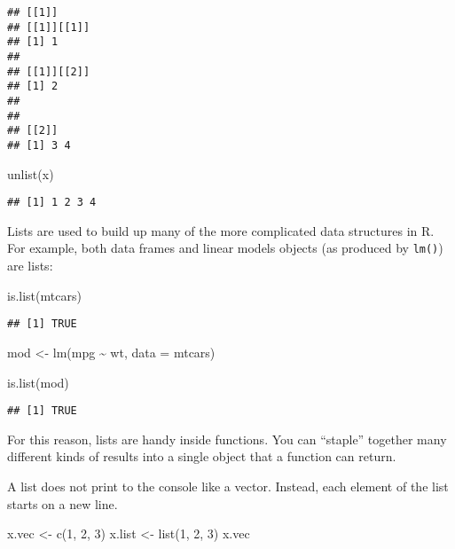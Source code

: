 \documentclass[
]{book}
\newenvironment{Shaded}{\begin{snugshade}}{\end{snugshade}}
\newcommand{\AttributeTok}[1]{\textcolor[rgb]{0.77,0.63,0.00}{#1}}
\newcommand{\DecValTok}[1]{\textcolor[rgb]{0.00,0.00,0.81}{#1}}
\newcommand{\FunctionTok}[1]{\textcolor[rgb]{0.00,0.00,0.00}{#1}}
\newcommand{\NormalTok}[1]{#1}
\newcommand{\OtherTok}[1]{\textcolor[rgb]{0.56,0.35,0.01}{#1}}
\newcommand{\SpecialCharTok}[1]{\textcolor[rgb]{0.00,0.00,0.00}{#1}}
\begin{document}
\begin{verbatim}
## [[1]]
## [[1]][[1]]
## [1] 1
## 
## [[1]][[2]]
## [1] 2
## 
## 
## [[2]]
## [1] 3 4
\end{verbatim}

\begin{Shaded}
\begin{Highlighting}[]
\FunctionTok{unlist}\NormalTok{(x)}
\end{Highlighting}
\end{Shaded}

\begin{verbatim}
## [1] 1 2 3 4
\end{verbatim}

Lists are used to build up many of the more complicated data structures in R. For example, both data frames and linear models objects (as produced by \texttt{lm()}) are lists:

\begin{Shaded}
\begin{Highlighting}[]
\FunctionTok{is.list}\NormalTok{(mtcars)}
\end{Highlighting}
\end{Shaded}

\begin{verbatim}
## [1] TRUE
\end{verbatim}

\begin{Shaded}
\begin{Highlighting}[]
\NormalTok{mod }\OtherTok{\textless{}{-}} \FunctionTok{lm}\NormalTok{(mpg }\SpecialCharTok{\textasciitilde{}}\NormalTok{ wt, }\AttributeTok{data =}\NormalTok{ mtcars)}

\FunctionTok{is.list}\NormalTok{(mod)}
\end{Highlighting}
\end{Shaded}

\begin{verbatim}
## [1] TRUE
\end{verbatim}

For this reason, lists are handy inside functions. You can ``staple'' together many different kinds of results into a single object that a function can return.

A list does not print to the console like a vector. Instead, each element of the list starts on a new line.

\begin{Shaded}
\begin{Highlighting}[]
\NormalTok{x.vec }\OtherTok{\textless{}{-}} \FunctionTok{c}\NormalTok{(}\DecValTok{1}\NormalTok{, }\DecValTok{2}\NormalTok{, }\DecValTok{3}\NormalTok{)}
\NormalTok{x.list }\OtherTok{\textless{}{-}} \FunctionTok{list}\NormalTok{(}\DecValTok{1}\NormalTok{, }\DecValTok{2}\NormalTok{, }\DecValTok{3}\NormalTok{)}
\NormalTok{x.vec}
\end{Highlighting}
\end{Shaded}
\end{document}

